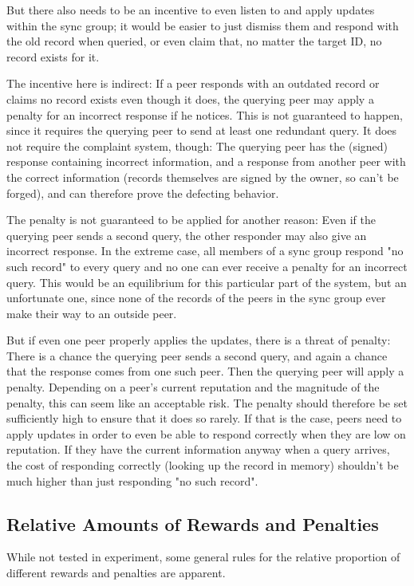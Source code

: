 But there also needs to be an incentive to even listen to and apply updates
within the sync group; it would be easier to just dismiss them and respond with
the old record when queried, or even claim that, no matter the target ID, no
record exists for it.

The incentive here is indirect: If a peer responds with an outdated record or
claims no record exists even though it does, the querying peer may apply a
penalty for an incorrect response if he notices. This is not guaranteed to
happen, since it requires the querying peer to send at least one redundant
query. It does not require the complaint system, though: The querying peer has
the (signed) response containing incorrect information, and a response from
another peer with the correct information (records themselves are signed by the
owner, so can't be forged), and can therefore prove the defecting behavior.

The penalty is not guaranteed to be applied for another reason: Even if the
querying peer sends a second query, the other responder may also give an
incorrect response. In the extreme case, all members of a sync group respond "no
such record" to every query and no one can ever receive a penalty for an
incorrect query. This would be an equilibrium for this particular part of the
system, but an unfortunate one, since none of the records of the peers in the
sync group ever make their way to an outside peer.

But if even one peer properly applies the updates, there is a threat of penalty:
There is a chance the querying peer sends a second query, and again a chance
that the response comes from one such peer. Then the querying peer will apply a
penalty. Depending on a peer's current reputation and the magnitude of the
penalty, this can seem like an acceptable risk. The penalty should therefore be
set sufficiently high to ensure that it does so rarely. If that is the case,
peers need to apply updates in order to even be able to respond correctly when
they are low on reputation. If they have the current information anyway when a
query arrives, the cost of responding correctly (looking up the record in
memory) shouldn't be much higher than just responding "no such record".

\subsection{Relative Amounts of Rewards and Penalties}
While not tested in experiment, some general rules for the relative proportion
of different rewards and penalties are apparent.

